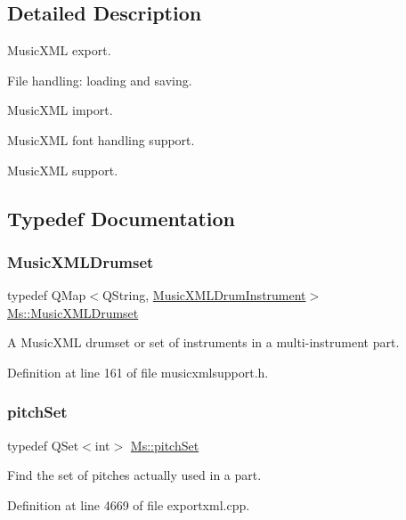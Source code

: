 \subsection{Detailed Description}
Music\+X\+ML export.

File handling\+: loading and saving.

Music\+X\+ML import.

Music\+X\+ML font handling support.

Music\+X\+ML support. 

\subsection{Typedef Documentation}
\mbox{\label{namespace_ms_a568bb2597ab1d23e4660f255997223c2}} 
\subsubsection{\texorpdfstring{Music\+X\+M\+L\+Drumset}{MusicXMLDrumset}}
{\footnotesize\ttfamily typedef Q\+Map$<$Q\+String, \hyperlink{struct_ms_1_1_music_x_m_l_drum_instrument}{Music\+X\+M\+L\+Drum\+Instrument}$>$ \hyperlink{namespace_ms_a568bb2597ab1d23e4660f255997223c2}{Ms\+::\+Music\+X\+M\+L\+Drumset}}

A Music\+X\+ML drumset or set of instruments in a multi-\/instrument part. 

Definition at line 161 of file musicxmlsupport.\+h.

\mbox{\label{namespace_ms_a3d8513692c92aa394efc33a044448337}} 
\subsubsection{\texorpdfstring{pitch\+Set}{pitchSet}}
{\footnotesize\ttfamily typedef Q\+Set$<$int$>$ \hyperlink{namespace_ms_a3d8513692c92aa394efc33a044448337}{Ms\+::pitch\+Set}}

Find the set of pitches actually used in a part. 

Definition at line 4669 of file exportxml.\+cpp.

\mbox{\label{namespace_ms_a53322ca7de949b92f493bb3b6a5fc202}} 
